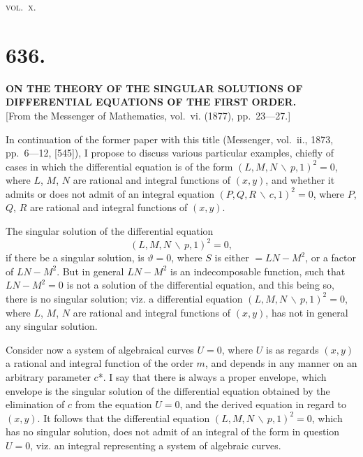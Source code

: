 \documentclass[12pt,a4paper]{article}
\theoremstyle{plain}
\theoremstyle{definition}
\theoremstyle{remark}
\begin{document}
\hfill\textsc{vol.~x.}

\clearpage
\setcounter{page}{19}

\section*{636.}

\begin{center}
\textbf{ON THE THEORY OF THE SINGULAR SOLUTIONS OF DIFFERENTIAL EQUATIONS OF THE FIRST ORDER.}\\[1em]
[From the Messenger of Mathematics, vol.~vi. (1877), pp.~23---27.]
\end{center}

In continuation of the former paper with this title (Messenger, vol.~ii., 1873, pp.~6---12, [545]), I propose to discuss various particular examples, chiefly of cases in which the differential equation is of the form $(L, M, N \,\backslash\, p, 1)^2 = 0$, where $L$, $M$, $N$ are rational and integral functions of $(x, y)$, and whether it admits or does not admit of an integral equation $(P, Q, R \,\backslash\, c, 1)^2 = 0$, where $P$, $Q$, $R$ are rational and integral functions of $(x, y)$.

The singular solution of the differential equation
\[
(L, M, N \,\backslash\, p, 1)^2 = 0,
\]
if there be a singular solution, is $\vartheta = 0$, where $S$ is either $= LN - M^2$, or a factor of $LN - M^2$. But in general $LN - M^2$ is an indecomposable function, such that $LN - M^2 = 0$ is not a solution of the differential equation, and this being so, there is no singular solution; viz. a differential equation $(L, M, N \,\backslash\, p, 1)^2 = 0$, where $L$, $M$, $N$ are rational and integral functions of $(x, y)$, has not in general any singular solution.

Consider now a system of algebraical curves $U = 0$, where $U$ is as regards $(x, y)$ a rational and integral function of the order $m$, and depends in any manner on an arbitrary parameter $c$*. I say that there is always a proper envelope, which envelope is the singular solution of the differential equation obtained by the elimination of $c$ from the equation $U = 0$, and the derived equation in regard to $(x, y)$. It follows that the differential equation $(L, M, N \,\backslash\, p, 1)^2 = 0$, which has no singular solution, does not admit of an integral of the form in question $U = 0$, viz. an integral representing a system of algebraic curves.
\end{document}
